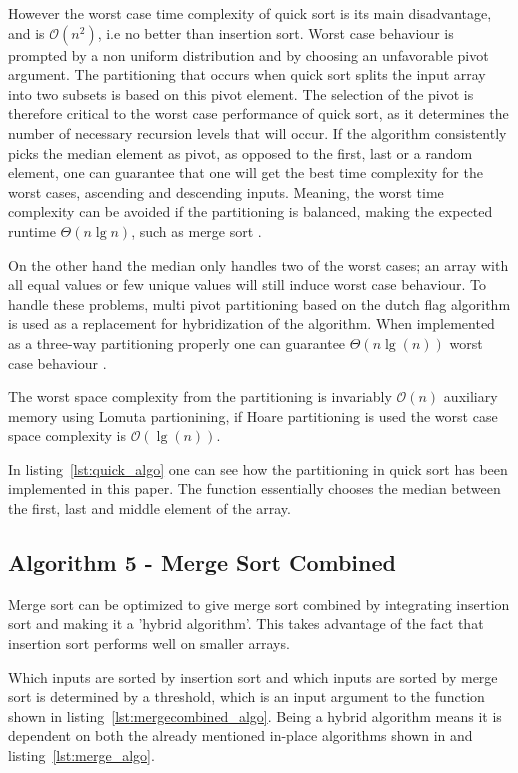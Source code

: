 \documentclass[sigconf, nonacm, natbib, screen, balance=False]{acmart}
\begin{document}
However the worst case time complexity of quick sort is its main disadvantage, and is $\mathcal{O}(n^2)$, i.e no better than insertion sort. Worst case behaviour is prompted by a non uniform distribution and by choosing an unfavorable pivot argument. The partitioning that occurs when quick sort splits the input array into two subsets is based on this pivot element. The selection of the pivot is therefore critical to the worst case performance of quick sort, as it determines the number of necessary recursion levels that will occur. If the algorithm consistently picks the median element as pivot, as opposed to the first, last or a random element, one can guarantee that one will get the best time complexity for the worst cases, ascending and descending inputs. Meaning, the worst time complexity can be avoided if the partitioning is balanced, making the expected runtime $\Theta(n\lg n)$, such as merge sort \cite{SortingA29:online}.

On the other hand the median only handles two of the worst cases; an array with all equal values or few unique values will still induce worst case behaviour. To handle these problems, multi pivot partitioning based on the dutch flag algorithm is used as a replacement for hybridization of the algorithm. When implemented as a three-way partitioning properly one can guarantee $\Theta(n\lg(n))$ worst case behaviour \cite{Quicksor66:online}.

The worst space complexity from the partitioning is invariably $\mathcal{O}(n)$ \cite{Microsof28:online} auxiliary memory using Lomuta partionining, if Hoare partitioning is used the worst case space complexity is $\mathcal{O}(\lg (n))$.

In listing~\ref{lst:quick_algo} one can see how the partitioning in quick sort has been implemented in this paper. The  function essentially chooses the median between the first, last and middle element of the array.

\subsection{Algorithm 5 - Merge Sort Combined}\label{sec:algo5}

Merge sort can be optimized to give merge sort combined by integrating insertion sort and making it a 'hybrid algorithm'. This takes advantage of the fact that insertion sort performs well on smaller arrays. 

Which inputs are sorted by insertion sort and which inputs are sorted by merge sort is determined by a threshold, which is an input argument to the function shown in listing~\ref{lst:mergecombined_algo}. Being a hybrid algorithm means it is dependent on both the already mentioned in-place algorithms shown in \citet[Ch.~2.1]{CLRS_2009} and listing~\ref{lst:merge_algo}.
\end{document}
